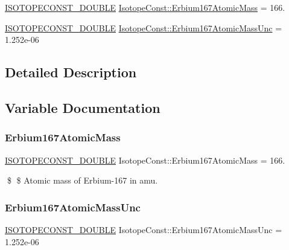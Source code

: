 \begin{DoxyCompactItemize}
\item 
\mbox{\hyperlink{group___isotope_const-_macros_ga8f45a7272ce02c0b4c65c44636ed719a}{I\+S\+O\+T\+O\+P\+E\+C\+O\+N\+S\+T\+\_\+\+D\+O\+U\+B\+LE}} \mbox{\hyperlink{group___isotope_const-_erbium-_er167_ga12b8d3dab0e0262f0cc8cdc1736f1e92}{Isotope\+Const\+::\+Erbium167\+Atomic\+Mass}} = 166.
\item 
\mbox{\hyperlink{group___isotope_const-_macros_ga8f45a7272ce02c0b4c65c44636ed719a}{I\+S\+O\+T\+O\+P\+E\+C\+O\+N\+S\+T\+\_\+\+D\+O\+U\+B\+LE}} \mbox{\hyperlink{group___isotope_const-_erbium-_er167_ga4d4b733609097089a474fc53a4fc3610}{Isotope\+Const\+::\+Erbium167\+Atomic\+Mass\+Unc}} = 1.\+252e-\/06
\end{DoxyCompactItemize}


\subsection{Detailed Description}


\subsection{Variable Documentation}
\mbox{\label{group___isotope_const-_erbium-_er167_ga12b8d3dab0e0262f0cc8cdc1736f1e92}} 
\subsubsection{\texorpdfstring{Erbium167\+Atomic\+Mass}{Erbium167AtomicMass}}
{\footnotesize\ttfamily \mbox{\hyperlink{group___isotope_const-_macros_ga8f45a7272ce02c0b4c65c44636ed719a}{I\+S\+O\+T\+O\+P\+E\+C\+O\+N\+S\+T\+\_\+\+D\+O\+U\+B\+LE}} Isotope\+Const\+::\+Erbium167\+Atomic\+Mass = 166.}

\$ \$ Atomic mass of Erbium-\/167 in amu. \mbox{\label{group___isotope_const-_erbium-_er167_ga4d4b733609097089a474fc53a4fc3610}} 
\subsubsection{\texorpdfstring{Erbium167\+Atomic\+Mass\+Unc}{Erbium167AtomicMassUnc}}
{\footnotesize\ttfamily \mbox{\hyperlink{group___isotope_const-_macros_ga8f45a7272ce02c0b4c65c44636ed719a}{I\+S\+O\+T\+O\+P\+E\+C\+O\+N\+S\+T\+\_\+\+D\+O\+U\+B\+LE}} Isotope\+Const\+::\+Erbium167\+Atomic\+Mass\+Unc = 1.\+252e-\/06}

